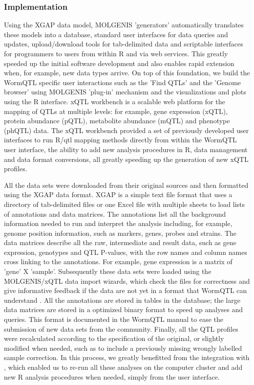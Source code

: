 \subsubsection{Implementation}
Using the XGAP data model, MOLGENIS 'generators' automatically translates these models into a 
database, standard user interfaces for data queries and updates, upload/download tools for 
tab-delimited data and scriptable interfaces for programmers to users from within R and via 
web services. This greatly speeded up the initial software development and also enables rapid 
extension when, for example, new data types arrive. On top of this foundation, we build the 
WormQTL specific user interactions such as the 'Find QTLs' and the 'Genome browser' using 
MOLGENIS 'plug-in' mechanism and the visualizations and plots using the R interface. xQTL 
workbench is a scalable web platform for the mapping of QTLs at multiple levels: for example, 
gene expression (xQTL), protein abundance (pQTL), metabolite abundance (mQTL) and phenotype 
(phQTL) data. The xQTL workbench provided a set of previously developed user interfaces to 
run R/qtl mapping methods directly from within the WormQTL user interface, the ability to 
add new analysis procedures in R, data management and data format conversions, all greatly 
speeding up the generation of new xQTL profiles.

All the data sets were downloaded from their original sources and then formatted using the 
XGAP data format. XGAP is a simple text file format that uses a directory of tab-delimited 
files or one Excel file with multiple sheets to load lists of annotations and data matrices. 
The annotations list all the background information needed to run and interpret the analysis 
including, for example, genome position information, such as markers, genes, probes and 
strains. The data matrices describe all the raw, intermediate and result data, such as gene 
expression, genotypes and QTL P-values, with the row names and column names cross linking to 
the annotations. For example, gene expression is a matrix of 'gene' X 'sample'. Subsequently 
these data sets were loaded using the MOLGENIS/xQTL data import wizards, which check the 
files for correctness and give informative feedback if the data are not yet in a format that 
WormQTL can understand \cite{Swertz:2010a}. All the annotations are stored in tables in the database; the 
large data matrices are stored in a optimized binary format to speed up analyses and queries. 
This format is documented in the WormQTL manual to ease the submission of new data sets from 
the community. Finally, all the QTL profiles were recalculated according to the specification 
of the original, or slightly modified when needed, such as to include a previously missing 
wrongly labelled sample correction. In this process, we greatly benefitted from the integration 
with \xqtlwb, which enabled us to re-run all these analyses on the computer cluster 
and add new R analysis procedures when needed, simply from the user interface.

